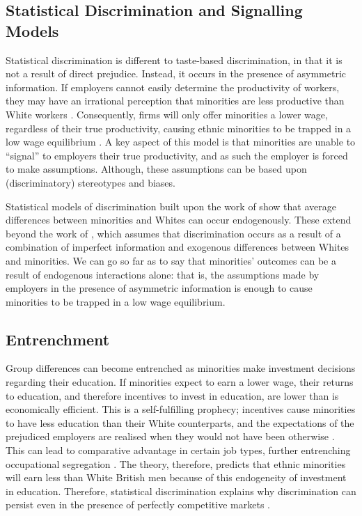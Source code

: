 \documentclass[class=article, crop=false]{standalone}
\begin{document}
\subsection{Statistical Discrimination and Signalling Models}
\label{sec:Stat_discrim and signalling}
Statistical discrimination is different to taste-based discrimination, in that it is not a result of direct prejudice. Instead, it occurs in the presence of asymmetric information. If employers cannot easily determine the productivity of workers, they may have an irrational perception that minorities are less productive than White workers \citep{Phelps, LundbergB}. Consequently, firms will only offer minorities a lower wage, regardless of their true productivity, causing ethnic minorities to be trapped in a low wage equilibrium \citep{Barr}. A key aspect of this model is that minorities are unable to \enquote{signal} to employers their true productivity, and as such the employer is forced to make assumptions. Although, these assumptions can be based upon (discriminatory) stereotypes and biases.

Statistical models of discrimination built upon the work of \citet{Arrow} show that average differences between minorities and Whites can occur endogenously. These extend beyond the work of \citet{Phelps}, which assumes that discrimination occurs as a result of a combination of imperfect information and exogenous differences between Whites and minorities. We can go so far as to say that minorities' outcomes can be a result of endogenous interactions alone: that is, the assumptions made by employers in the presence of asymmetric information is enough to cause minorities to be trapped in a low wage equilibrium. 

\subsection{Entrenchment}
Group differences can become entrenched as minorities make investment decisions regarding their education. If minorities expect to earn a lower wage, their returns to education, and therefore incentives to invest in education, are lower than is economically efficient. This is a self-fulfilling prophecy; incentives cause minorities to have less education than their White counterparts, and the expectations of the prejudiced employers are realised when they would not have been otherwise \citep{Hanming}. This can lead to comparative advantage in certain job types, further entrenching occupational segregation \citep{Altonji}. The theory, therefore, predicts that ethnic minorities will earn less than White British men because of this endogeneity of investment in education. Therefore, statistical discrimination explains why discrimination can persist even in the presence of perfectly competitive markets \citep{LundbergB}.
\end{document}
